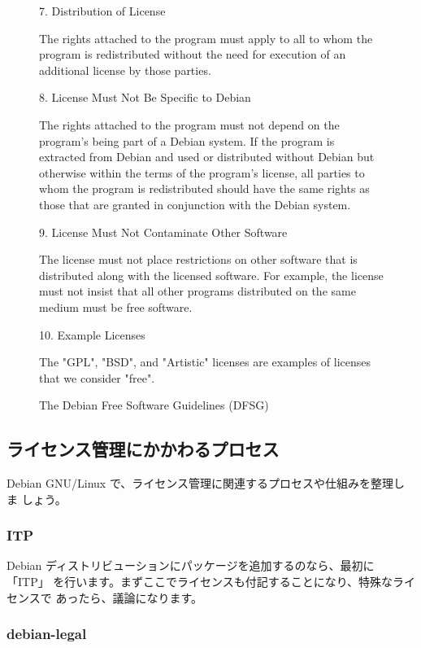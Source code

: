 \documentclass[mingoth,a4paper]{jsarticle}
\begin{document}
\begin{figure}[h]
\begin{multicols}{2}
{    7. Distribution of License

       The rights attached to the program must apply to all to whom the
       program is redistributed without the need for execution of an
       additional license by those parties.

    8. License Must Not Be Specific to Debian

       The rights attached to the program must not depend on the
       program's being part of a Debian system. If the program is
       extracted from Debian and used or distributed without Debian but
       otherwise within the terms of the program's license, all parties
       to whom the program is redistributed should have the same rights
       as those that are granted in conjunction with the Debian system.

    9. License Must Not Contaminate Other Software

       The license must not place restrictions on other software that is
       distributed along with the licensed software. For example, the
       license must not insist that all other programs distributed on the
       same medium must be free software.

   10. Example Licenses

       The "GPL", "BSD", and "Artistic" licenses are examples of licenses
       that we consider "free".
 }
 \end{multicols}
\caption{The Debian Free Software Guidelines (DFSG)}
\label{fig:dfsg}
\end{figure}


\subsection{ライセンス管理にかかわるプロセス}

Debian GNU/Linux で、ライセンス管理に関連するプロセスや仕組みを整理しま
しょう。

\subsubsection{ITP}

Debian ディストリビューションにパッケージを追加するのなら、最初に「ITP」
を行います。まずここでライセンスも付記することになり、特殊なライセンスで
あったら、議論になります。

\subsubsection{debian-legal}
\end{document}
